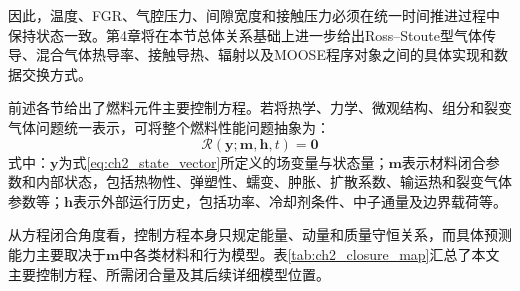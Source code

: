 因此，温度、FGR、气腔压力、间隙宽度和接触压力必须在统一时间推进过程中保持状态一致。第4章将在本节总体关系基础上进一步给出Ross--Stoute型气体传导、混合气体热导率、接触导热、辐射以及MOOSE程序对象之间的具体实现和数据交换方式。

\label{sec:ch2_closure_summary}

前述各节给出了燃料元件主要控制方程。若将热学、力学、微观结构、组分和裂变气体问题统一表示，可将整个燃料性能问题抽象为：
\begin{equation}
	\mathcal R
	\left(
	\mathbf y;\mathbf m,\mathbf h,t
	\right)
	=\mathbf 0
	\label{eq:ch2_global_residual}
\end{equation}
\noindent 式中：$\mathbf y$为式\eqref{eq:ch2_state_vector}所定义的场变量与状态量；$\mathbf m$表示材料闭合参数和内部状态，包括热物性、弹塑性、蠕变、肿胀、扩散系数、输运热和裂变气体参数等；$\mathbf h$表示外部运行历史，包括功率、冷却剂条件、中子通量及边界载荷等。

从方程闭合角度看，控制方程本身只规定能量、动量和质量守恒关系，而具体预测能力主要取决于$\mathbf m$中各类材料和行为模型。表\ref{tab:ch2_closure_map}汇总了本文主要控制方程、所需闭合量及其后续详细模型位置。

